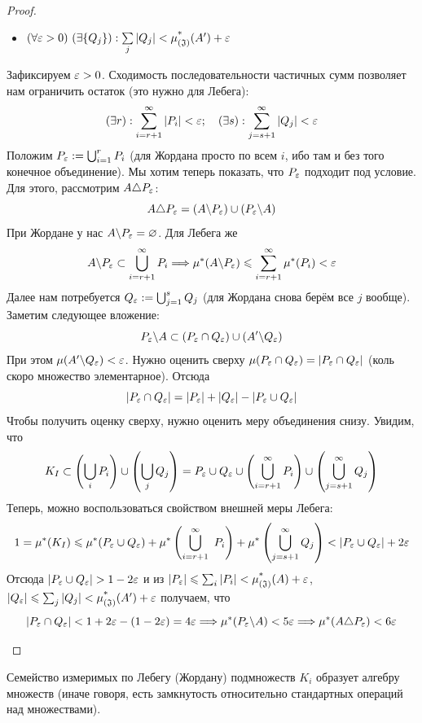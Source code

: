 \begin{proof}
\begin{itemize}
\begin{itemize}
			\item \((\forall \varepsilon > 0)\ (\exists \{Q_j\}) : \sum\limits_j |Q_j| < \operatorname{\mu^*_{(\mathfrak{J})}}(A') + \varepsilon\)
		\end{itemize}
		Зафиксируем $\varepsilon > 0$. Сходимость последовательности частичных сумм позволяет нам ограничить остаток (это нужно для Лебега):
		\[
			(\exists r) : \sum\limits_{i = r + 1}^\infty |P_i| < \varepsilon; \quad (\exists s) : \sum\limits_{j = s + 1}^\infty |Q_j| < \varepsilon
		\]
		Положим $P_\varepsilon := \bigcup_{i = 1}^r P_i$ (для Жордана просто по всем $i$, ибо там и без того конечное объединение). Мы хотим теперь показать, что $P_\varepsilon$ подходит под условие. Для этого, рассмотрим $A \triangle P_\varepsilon$:
		\[
			A \triangle P_\varepsilon = (A \backslash P_\varepsilon) \cup (P_\varepsilon \backslash A)
		\]
		При Жордане у нас $A \backslash P_\varepsilon = \varnothing$. Для Лебега же
		\[
			A \backslash P_\varepsilon \subset \bigcup_{i = r + 1}^\infty P_i \Longrightarrow \mu^*(A \backslash P_\varepsilon) \leqslant \sum\limits_{i = r + 1}^\infty \mu^*(P_i) < \varepsilon
		\]
		Далее нам потребуется $Q_\varepsilon := \bigcup_{j = 1}^s Q_j$ (для Жордана снова берём все $j$ вообще). Заметим следующее вложение:
		\[
			P_\varepsilon \backslash A \subset (P_\varepsilon \cap Q_\varepsilon) \cup (A' \backslash Q_\varepsilon)
		\]
		При этом $\mu(A' \backslash Q_\varepsilon) < \varepsilon$. Нужно оценить сверху $\mu(P_\varepsilon \cap Q_\varepsilon) = |P_\varepsilon \cap Q_\varepsilon|$ (коль скоро множество элементарное). Отсюда
		\[
			|P_\varepsilon \cap Q_\varepsilon| = |P_\varepsilon| + |Q_\varepsilon| - |P_\varepsilon \cup Q_\varepsilon|
		\]
		Чтобы получить оценку сверху, нужно оценить меру объединения снизу. Увидим, что
		\[
			K_I \subset \left(\bigcup_i P_i\right) \cup \left(\bigcup_j Q_j\right) = P_\varepsilon \cup Q_\varepsilon \cup \left(\bigcup_{i = r + 1}^\infty P_i\right) \cup \left(\bigcup_{j = s + 1}^\infty Q_j\right)
		\]
		Теперь, можно воспользоваться свойством внешней меры Лебега:
		\[
			1 = \mu^*(K_I) \leqslant \mu^*(P_\varepsilon \cup Q_\varepsilon) + \mu^*\left(\bigcup_{i = r + 1}^\infty\ P_i\right) + \mu^*\left(\bigcup_{j = s + 1}^\infty Q_j\right) < |P_\varepsilon \cup Q_\varepsilon| + 2\varepsilon
		\]
		Отсюда $|P_\varepsilon \cup Q_\varepsilon| > 1 - 2\varepsilon$ и из $|P_\varepsilon| \leqslant \sum_i |P_i| < \operatorname{\mu^*_{(\mathfrak{J})}}(A) + \varepsilon$, $|Q_\varepsilon| \leqslant \sum_j |Q_j| < \operatorname{\mu^*_{(\mathfrak{J})}}(A') + \varepsilon$ получаем, что
		\[
			|P_\varepsilon \cap Q_\varepsilon| < 1 + 2\varepsilon - (1 - 2\varepsilon) = 4\varepsilon \Longrightarrow \mu^*(P_\varepsilon \backslash A) < 5\varepsilon \Longrightarrow \mu^*(A \triangle P_\varepsilon) < 6\varepsilon
		\]
	\end{itemize}
\end{proof}

\begin{theorem}
	Семейство измеримых по Лебегу (Жордану) подмножеств $K_i$ образует алгебру множеств (иначе говоря, есть замкнутость относительно стандартных операций над множествами).
\end{theorem}

